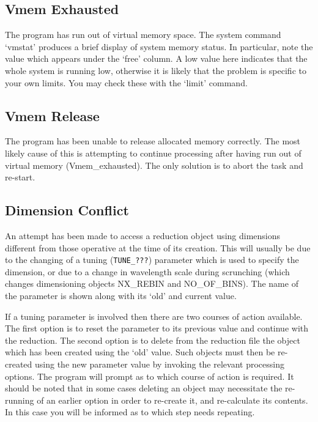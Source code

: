 \documentclass[11pt,twoside]{article}
\newcommand{\xlabel}[1]{}
\newcommand{\mlabel}[1]{\xlabel{#1}\label{#1}}
\newcommand{\myindex}[1]{\index{#1}}
\renewcommand{\myindex}[1]{}
\begin{document}
\subsection{\mlabel{vmem_exhausted} Vmem Exhausted}
\myindex{Memory!running out}
\myindex{Running out of memory}

The program has run out of virtual memory space. The system command
`vmstat' produces a brief display of system memory status.
In particular, note the value which appears under the `free' column.
A low value here indicates that the whole system is running low,
otherwise it is likely that the problem is specific to your own
limits.  You may check these with the `limit' command.

\subsection{\mlabel{vmem_release} Vmem Release}

The program has been unable to release allocated memory correctly. The
most likely cause of this is attempting to continue processing after
having run out of virtual memory (Vmem\_exhausted). The only solution is
to abort the task and re-start.

\subsection{\mlabel{dimension_conflict} Dimension Conflict}

An attempt has been made to access a reduction object using dimensions
different from those operative at the time of its creation. This will
usually be due to the changing of a tuning (\texttt{TUNE\_???}) parameter
which is used to specify the dimension, or due to a change in wavelength
scale during scrunching (which changes dimensioning objects NX\_REBIN
and NO\_OF\_BINS). The name of the parameter is shown along with its
`old' and current value.

If a tuning parameter is involved then there are two courses of action
available. The first option is to reset the parameter to its previous
value and continue with the reduction. The second option is to delete
from the reduction file the object which has been created using the
`old' value. Such objects must then be re-created using the new
parameter value by invoking the relevant processing options. The program
will prompt as to which course of action is required. It should
be noted that in some cases deleting an object may necessitate the
re-running of an earlier option in order to re-create it, and
re-calculate its contents.
In this case you will be informed as to which step needs repeating.
\end{document}
